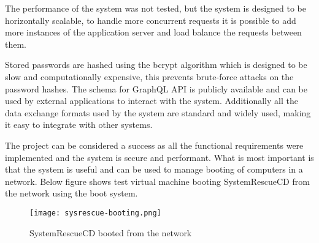 \documentclass[./main.tex]{subfiles}
\begin{document}
The performance of the system was not tested, but the system is designed to be
horizontally scalable, to handle more concurrent requests it is possible to add more
instances of the application server and load balance the requests between them.

Stored passwords are hashed using the bcrypt algorithm which is designed to
be slow and computationally expensive, this prevents brute-force attacks on the
password hashes. The schema for GraphQL API is publicly available and can be
used by external applications to interact with the system. Additionally all the data
exchange formats used by the system are standard and widely used, making it easy
to integrate with other systems.

The project can be considered a success as all the functional requirements were
implemented and the system is secure and performant. What is most important
is that the system is useful and can be used to manage booting of computers in a
network. Below figure shows test virtual machine booting SystemRescueCD from
the network using the boot system.

\begin{figure}[H]
  \centering
  \texttt{[image: sysrescue-booting.png]}
  \caption{SystemRescueCD booted from the network}
\end{figure}
\end{document}
